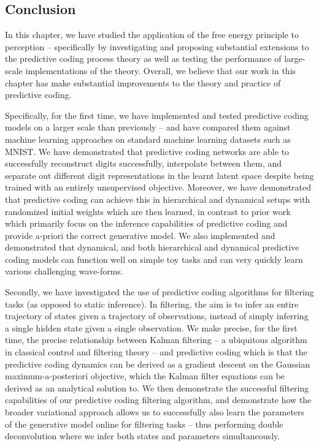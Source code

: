 \subsection{Conclusion}

In this chapter, we have studied the application of the free energy principle to perception -- specifically by investigating and proposing substantial extensions to the predictive coding process theory \citep{friston2003learning,friston2005theory,friston2008hierarchical} as well as testing the performance of large-scale implementations of the theory. Overall, we believe that our work in this chapter has make substantial improvements to the theory and practice of predictive coding.

Specifically, for the first time, we have implemented and tested predictive coding models on a larger scale than previously -- and have compared them against machine learning approaches on standard machine learning datasets such as MNIST. We have demonstrated that predictive coding networks are able to successfully reconstruct digits successfully, interpolate between them, and separate out different digit representations in the learnt latent space despite being trained with an entirely unsupervised objective. Moreover, we have demonstrated that predictive coding can achieve this in hierarchical and dynamical setups with randomized initial weights which are then learned, in contrast to prior work \citep{friston2008DEM,friston2008hierarchical,friston2005theory} which primarily focus on the inference capabilities of predictive coding and provide a-priori the correct generative model. We also implemented and demonstrated that dynamical, and both hierarchical and dynamical predictive coding models can function well on simple toy tasks and can very quickly learn various challenging wave-forms.

Secondly, we have investigated the use of predictive coding algorithms for filtering tasks (as opposed to static inference). In filtering, the aim is to infer an entire trajectory of states given a trajectory of observations, instead of simply inferring a single hidden state given a single observation. We make precise, for the first time, the precise relationship between Kalman filtering -- a ubiquitous algorithm in classical control and filtering theory -- and predictive coding which is that the predictive coding dynamics can be derived as a gradient descent on the Gaussian maximum-a-posteriori objective, which the Kalman filter equations can be derived as an analytical solution to. We then demonstrate the successful filtering capabilities of our predictive coding filtering algorithm, and demonstrate how the broader variational approach allows us to successfully also learn the parameters of the generative model online for filtering tasks -- thus performing double deconvolution where we infer both states and parameters simultaneously. 

